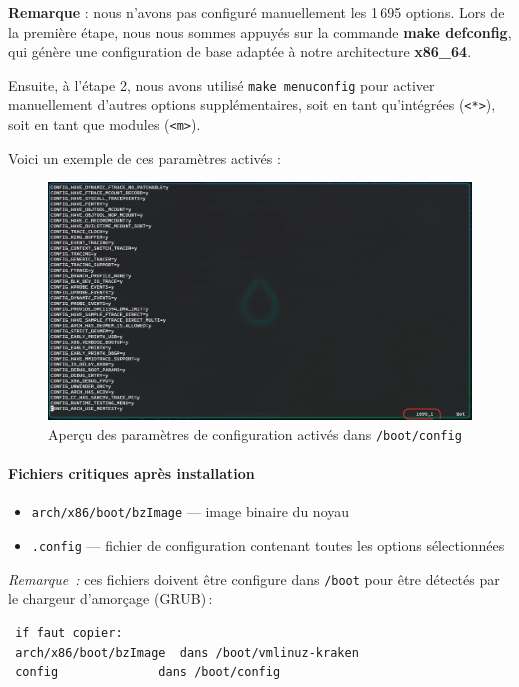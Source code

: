 \textbf{Remarque} : nous n'avons pas configuré manuellement les 1 695 options. Lors de la première étape, nous nous sommes appuyés sur la commande \textbf{make defconfig}, qui génère une configuration de base adaptée à notre architecture \textbf{x86\_64}. 

Ensuite, à l'étape 2, nous avons utilisé \texttt{make menuconfig} pour activer manuellement d'autres options supplémentaires, soit en tant qu’intégrées (\texttt{<*>}), soit en tant que modules (\texttt{<m>}).

Voici un exemple de ces paramètres activés :

\begin{figure}[H]  
  \centering  
  \includegraphics[width=1\textwidth]{images_pfe/numberconfig.png}  
  \caption{Aperçu des paramètres de configuration activés dans \texttt{/boot/config}}  
  \label{fig:kernel_config}  
\end{figure}  



\clearpage
\paragraph*{Fichiers critiques après installation}
\begin{itemize}
  \item \texttt{arch/x86/boot/bzImage} — image binaire du noyau   
  \item \texttt{.config} — fichier de configuration contenant toutes les options sélectionnées  
\end{itemize}

\textit{Remarque :} ces fichiers doivent être configure dans \texttt{/boot} pour être détectés par le chargeur d’amorçage (GRUB) :

\begin{verbatim}
 if faut copier:
 arch/x86/boot/bzImage  dans /boot/vmlinuz-kraken
 config              dans /boot/config
\end{verbatim}


